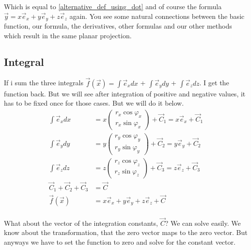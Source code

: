 \documentclass[a4paper]{article}
\begin{document}
Which is equal to \ref{alternative_def_using_dot} and of course the formula $\vec{y} = x\vec{e}_{x}+y\vec{e}_{y}+z\vec{e}_{z}$ again. You see some natural connections between the basic function, our formula, the derivatives, other formulas and our other methods which result in the same planar projection.\\

\subsection{Integral}

If i sum the three integrals $\vec{f}(\vec{x}) = \int\vec{e}_{x}dx$ + $\int\vec{e}_{y}dy$ + $\int\vec{e}_{z}dz$. I get the function back. But we will see after integration of positive and negative values, it has to be fixed once for those cases. But we will do it below.\\

\begin{displaymath}
\begin{align}
\int\vec{e}_{x}dx &= x\begin{pmatrix}r_x\cos\varphi_x\\r_x\sin\varphi_x\end{pmatrix} + \vec{C}_{1} = x\vec{e}_{x} + \vec{C}_{1}\\
\int\vec{e}_{y}dy &= y\begin{pmatrix}r_y\cos\varphi_y\\r_y\sin\varphi_y\end{pmatrix} + \vec{C}_{2} = y\vec{e}_{y} + \vec{C}_{2}\\
\int\vec{e}_{z}dz &= z\begin{pmatrix}r_z\cos\varphi_z\\r_z\sin\varphi_z\end{pmatrix} + \vec{C}_{3} = z\vec{e}_{z} + \vec{C}_{3}\\
\vec{C}_{1} + \vec{C}_{2} + \vec{C}_{3} &= \vec{C}\\
\vec{f}(\vec{x}) &= x\vec{e}_{x} +y\vec{e}_{y} +z\vec{e}_{z} + \vec{C}\\
\end{align}
\end{displaymath}

What about the vector of the integration constants, $\vec{C}$? We can solve easily. We know about the transformation, that the zero vector maps to the zero vector. But anyways we have to set the function to zero and solve for the constant vector.\\
\end{document}
